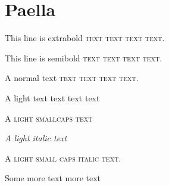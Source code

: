 \documentclass{scb}
\begin{document}
\section{Paella}

\sffamily

{\ebseries
This line is extrabold \textsc{text text text text}.}

{\sbseries
This line is semibold \textsc{text text text text}.}

A normal text \textsc{text text text text}.



\ltseries
A light text text text text

\textsc{A light smallcaps text}

\itshape A light italic text

\scshape A light small caps italic text.

\cleardoublepage

Some more text
\clearpage
more text
\end{document}
